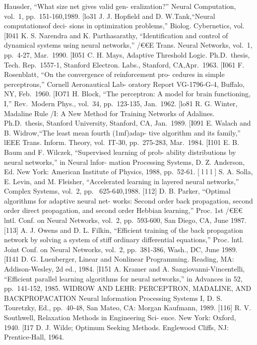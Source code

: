 Haussler, ``What size net gives valid gen- eralization?'' Neural
Computation, vol.~1, pp.~151-160,1989. {[}lo31 J. J. Hopfield and D.
W.Tank,``Neural computationsof deci- sions in optimization problems,''
Biolog. Cybernetics, vol.~ {[}I041 K. S. Narendra and K. Parthasarathy,
``Identification and control of dynamical systems using neural
networks,'' /€€E Trans. Neural Networks, vol.~1, pp.~4-27, Mar.~1990.
{[}I051 C. H. Mays, Adaptive Threshold Logic. Ph.D.~thesis, Tech.
Rep.~1557-1, Stanford Electron. Labs., Stanford, CA,Apr.~1963. {[}I061
F. Rosenblatt, ``On the convergence of reinforcement pro- cedures in
simple perceptrons,'' Cornell Aeronautical Lab- oratory Report
VG-1796-G-4, Buffalo, NY, Feb.~1960. {[}IO71 H. Block, ``The perceptron:
A model for brain functioning, I,'' Rev.~Modern Phys., vol.~34,
pp.~123-135, Jan.~1962. {[}lo81 R. G. Winter, Madaline Rule /I: A New
Method for Training Networks of Adalines. Ph.D.~thesis, Stanford
University, Stanford, CA, Jan.~1989. {[}I091 E. Walach and B.
Widrow,``The least mean fourth (1mf)adap- tive algorithm and its
family,'' lEEE Trans. Inform. Theory, vol.~IT-30, pp.~275-283,
Mar.~1984. {[}I101 E. B. Baum and F. Wilczek, ``Supervised learning of
prob- ability distributions by neural networks,'' in Neural lnfor-
mation Processing Systems, D. Z. Anderson, Ed. New York: American
Institute of Physics, 1988, pp.~52-61. {[} l l l {]} S. A. Solla, E.
Levin, and M. Fleisher, ``Accelerated learning in layered neural
networks,'' Complex Systems, vol.~2, pp.~ 625-640,1988. {[}112{]} D. B.
Parker, ``Optimal algorithms for adaptive neural net- works: Second
order back propagation, second order direct propagation, and second
order Hebbian learning,'' Proc. 1st /€E€ lntl. Conf. on Neural Networks,
vol.~2, pp.~593-600, San Diego, CA, June 1987. {[}113{]} A. J. Owens and
D. L. Filkin, ``Efficient training of the back propagation network by
solving a system of stiff ordinary differential equations,'' Proc. lntl.
Joint Conf. on Neural Networks, vol.~2, pp.~381-386, Wash., DC, June
1989. {[}I141 D. G. Luenberger, Linear and Nonlinear Programming.
Reading, MA: Addison-Wesley, 2d ed., 1984. {[}I151 A. Kramer and A.
Sangiovanni-Vincentelli, ``Efficient parallel learning algorithms for
neural networks,'' in Advances in 52, pp.~141-152, 1985. WIDROW AND
LEHR: PERCEPTRON, MADALINE, AND BACKPROPACATION Neural lnformation
Processing Systems I, D. S. Touretzky, Ed., pp.~40-48, San Mateo, CA:
Morgan Kaufmann, 1989. {[}116{]} R. V. Southwell, Relaxation Methods in
Engineering Sci- ence. New York: Oxford, 1940. {[}I17 D. J. Wilde;
Optimum Seeking Methods. Englewood Cliffs, NJ: Prentice-Hall, 1964.
